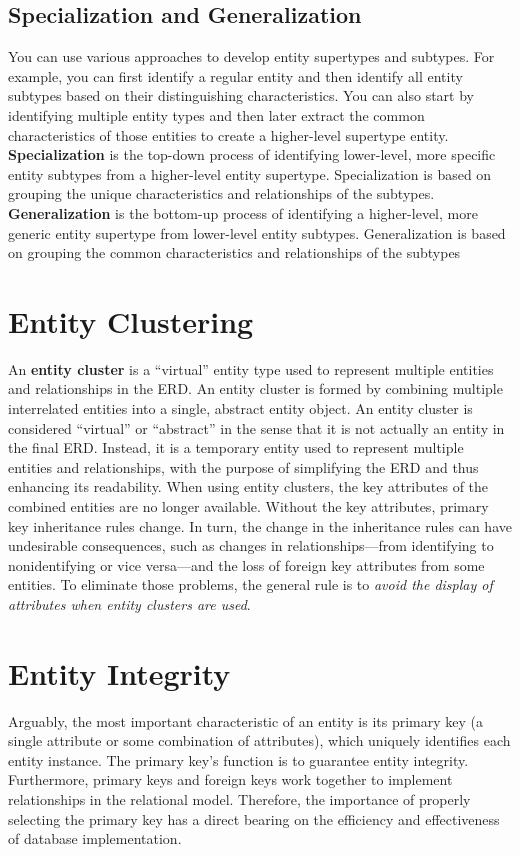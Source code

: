 \documentclass[a4paper, 12pt, titlepage]{report}
\begin{document}
{\subsection{Specialization and Generalization}
You can use various approaches to develop entity supertypes and subtypes. For example, you can first identify a regular entity and then identify all entity subtypes based on their
distinguishing characteristics. You can also start by identifying multiple entity types and then later extract the common characteristics of those entities to create a higher-level
supertype entity.\\
\textbf{Specialization} is the top-down process of identifying lower-level, more specific entity subtypes from a higher-level entity supertype. Specialization is based on grouping
the unique characteristics and relationships of the subtypes.\\
\textbf{Generalization} is the bottom-up process of identifying a higher-level, more generic entity supertype from lower-level entity subtypes. Generalization is based on
grouping the common characteristics and relationships of the subtypes
\section{Entity Clustering}
An \textbf{entity cluster} is a “virtual” entity type used to represent multiple entities and relationships in the ERD. An entity cluster is formed by combining multiple interrelated entities into a single, abstract entity object. An entity cluster is considered “virtual” or “abstract” in the sense that it is not actually an entity in the final ERD. Instead, it is a temporary entity used to represent multiple entities and relationships, with the purpose of simplifying the ERD and thus enhancing its readability. When using entity clusters, the key attributes of the combined entities are no longer available. Without the key attributes, primary key inheritance rules change. In turn, the
change in the inheritance rules can have undesirable consequences, such as changes in relationships—from identifying to nonidentifying or vice versa—and the loss of foreign
key attributes from some entities. To eliminate those problems, the general rule is to \emph{avoid the display of attributes when entity clusters are used}.
\section{Entity Integrity}
Arguably, the most important characteristic of an entity is its primary key (a single attribute or some combination of attributes), which uniquely identifies each entity instance. The primary key’s function is to guarantee entity integrity. Furthermore, primary keys and foreign keys work together to implement relationships in the relational model. Therefore, the importance of properly selecting the primary key has a direct bearing on the efficiency and effectiveness of database implementation.
}
\end{document}
